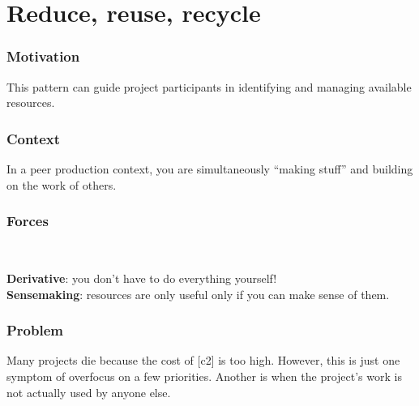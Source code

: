 \section{Reduce, reuse, recycle} \label{sec:Reduce, reuse, recycle}

\subsubsection*{Motivation} This pattern can guide project participants in identifying and managing available resources.


\subsubsection*{Context}
In a peer production context, you are simultaneously ``making stuff'' and building on the work of others.

\subsubsection*{Forces}~
\parbox[t]{.85\textwidth}{
\textbf{Derivative}: you don't have to do everything yourself!\\
\textbf{Sensemaking}: resources are only useful only if you can make sense of them.\\
}

\subsubsection*{Problem}
Many projects die because the cost of  [c2] is too high.  However, this is just one symptom of overfocus on a few priorities.  Another is when the project's work is not actually used by anyone else.

